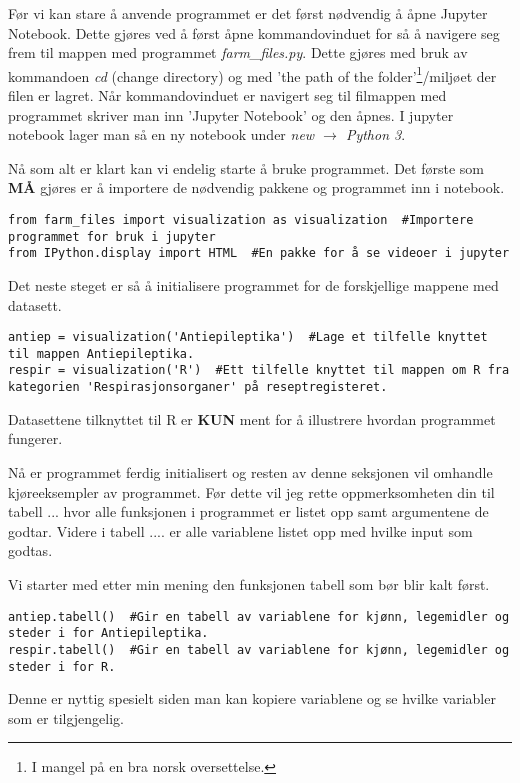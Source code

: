\documentclass[12pt,norsk,a4paper,fleqn]{article}
\numberwithin{equation}{section}
\begin{document}
Før vi kan stare å anvende programmet er det først nødvendig å åpne Jupyter Notebook. Dette gjøres ved å først åpne kommandovinduet for så å navigere seg frem til mappen med programmet \textit{farm\_files.py}. Dette gjøres med bruk av kommandoen \textit{cd} (change directory) og med 'the path of the folder'\footnote{I mangel på en bra norsk oversettelse.}/miljøet der filen er lagret. Når kommandovinduet er navigert seg til filmappen med programmet skriver man inn 'Jupyter Notebook' og den åpnes. I jupyter notebook lager man så en ny notebook under \textit{new \(\rightarrow\) Python 3}.

Nå som alt er klart kan vi endelig starte å bruke programmet. Det første som \textbf{MÅ} gjøres er å importere de nødvendig pakkene og programmet inn i notebook.
\begin{lstlisting}
from farm_files import visualization as visualization  #Importere programmet for bruk i jupyter
from IPython.display import HTML  #En pakke for å se videoer i jupyter
\end{lstlisting}
Det neste steget er så å initialisere programmet for de forskjellige mappene med datasett.
\begin{lstlisting}
antiep = visualization('Antiepileptika')  #Lage et tilfelle knyttet til mappen Antiepileptika.
respir = visualization('R')  #Ett tilfelle knyttet til mappen om R fra kategorien 'Respirasjonsorganer' på reseptregisteret.
\end{lstlisting}
Datasettene tilknyttet til R er \textbf{KUN} ment for å illustrere hvordan programmet fungerer.

Nå er programmet ferdig initialisert og resten av denne seksjonen vil omhandle kjøreeksempler av programmet. Før dette vil jeg rette oppmerksomheten din til tabell ... hvor alle funksjonen i programmet er listet opp samt argumentene de godtar. Videre i tabell .... er alle variablene listet opp med hvilke input som godtas.

Vi starter med etter min mening den funksjonen {\color{blue}tabell} som bør blir kalt først.
\begin{lstlisting}
antiep.tabell()  #Gir en tabell av variablene for kjønn, legemidler og steder i for Antiepileptika.
respir.tabell()  #Gir en tabell av variablene for kjønn, legemidler og steder i for R.
\end{lstlisting}
Denne er nyttig spesielt siden man kan kopiere variablene og se hvilke variabler som er tilgjengelig. 




 
\end{document}
